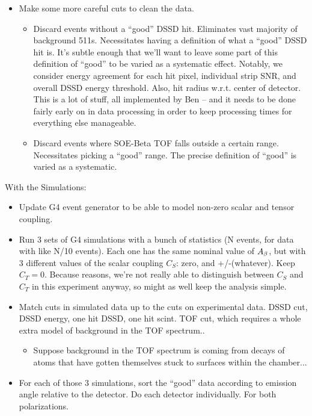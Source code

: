 \begin{itemize}
\begin{itemize}
		\end{itemize}
	\item Make some more careful cuts to clean the data.  
		\begin{itemize}
		\item Discard events without a ``good'' DSSD hit.  Eliminates vast majority of background 511s.  Necessitates having a definition of what a ``good'' DSSD hit is.  It's subtle enough that we'll want to leave some part of this definition of ``good'' to be varied as a systematic effect.  Notably, we consider energy agreement for each hit pixel, individual strip SNR, and overall DSSD energy threshold.  Also, hit radius w.r.t. center of detector.  This is a lot of stuff, all implemented by Ben -- and it needs to be done fairly early on in data processing in order to keep processing times for everything else manageable.  
		\item Discard events where SOE-Beta TOF falls outside a certain range.  Necessitates picking a ``good'' range.  The precise definition of ``good'' is varied as a systematic.
		\end{itemize}
\end{itemize}

\vspace{24pt}
\vspace{12pt}
With the Simulations:
\begin{itemize}
	\item Update G4 event generator to be able to model non-zero scalar and tensor coupling.   
	\item Run 3 sets of G4 simulations with a bunch of statistics (N events, for data with like N/10 events).  Each one has the same nominal value of $A_{\beta}$, but with 3 different values of the scalar coupling $C_S$:  zero, and +/-(whatever).  Keep $C_T=0$.  Because reasons, we're not really able to distinguish between $C_S$ and $C_T$ in this experiment anyway, so might as well keep the analysis simple.
	\item Match cuts in simulated data up to the cuts on experimental data.  DSSD cut, DSSD energy, one hit DSSD, one hit scint.  TOF cut, which requires a whole extra model of background in the TOF spectrum..
		\begin{itemize}
		\item Suppose background in the TOF spectrum is coming from decays of atoms that have gotten themselves stuck to surfaces within the chamber...
		\end{itemize}
	\item For each of those 3 simulations, sort the ``good'' data according to emission angle relative to the detector.  Do each detector individually.  For both polarizations.
	
\end{itemize}

